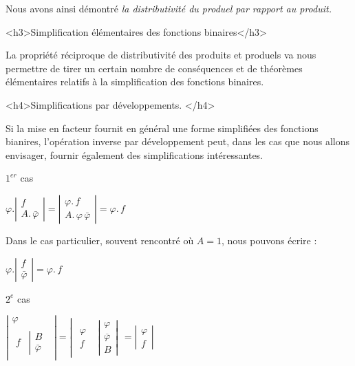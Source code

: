 Nous avons ainsi démontré \emph{la distributivité du produel par
rapport au produit.} 



<h3>Simplification élémentaires des fonctions binaires</h3>

La propriété réciproque de distributivité des produits et produels
va nous permettre de tirer un certain nombre de conséquences et de
théorèmes élémentaires relatifs à la simplification des fonctions
binaires.

<h4>Simplifications par développements. </h4>

Si la mise en facteur fournit en général une forme simplifiées des
fonctions bianires, l'opération inverse par développement peut, dans
les cas que nous allons envisager, fournir également des simplifications
intéressantes. 

$1^{er}$ cas

\begin{center}
$\varphi.\left|\begin{array}{c}
f\\
A.\,\bar{\varphi}
\end{array}\right|=\left|\begin{array}{c}
\varphi.\,f\\
A.\,\varphi\,\bar{\varphi}
\end{array}\right|=\varphi.\,f$
\end{center}

Dans le cas particulier, souvent rencontré où $A=1$, nous pouvons
écrire : 

\begin{center}
$\varphi.\left|\begin{array}{c}
f\\
\bar{\varphi}
\end{array}\right|=\varphi.\,f$
\end{center}

$2^{e}$ cas

\begin{center}
$\left|\begin{array}{c}
\varphi\\
\begin{array}{cc}
f & \left|\begin{array}{c}
B\\
\bar{\varphi}
\end{array}\right.\end{array}
\end{array}\right|=\left|\begin{array}{cc}
\begin{array}{c}
\varphi\\
f
\end{array} & \left|\begin{array}{c}
\varphi\\
\overline{\varphi}\\
B
\end{array}\right|\end{array}\right.=\left|\begin{array}{c}
\varphi\\
f
\end{array}\right|$

\end{center}

